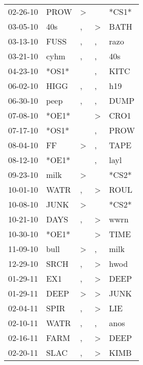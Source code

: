 \begin{supertabular}{lllll}
 02-26-10 &   PROW &     \textgreater &                  &  *CS1* \\
 03-05-10 &    40s &                , &     \textgreater &   BATH \\
 03-13-10 &   FUSS &                , &                , &   razo \\
 03-21-10 &   cyhm &                , &                , &    40s \\
 04-23-10 &  *OS1* &                  &                , &   KITC \\
 06-02-10 &   HIGG &                , &                , &    h19 \\
 06-30-10 &   peep &                , &                , &   DUMP \\
 07-08-10 &  *OE1* &                  &     \textgreater &   CRO1 \\
 07-17-10 &  *OS1* &                  &                , &   PROW \\
 08-04-10 &     FF &     \textgreater &                , &   TAPE \\
 08-12-10 &  *OE1* &                  &                , &   layl \\
 09-23-10 &   milk &     \textgreater &                  &  *CS2* \\
 10-01-10 &   WATR &                , &     \textgreater &   ROUL \\
 10-08-10 &   JUNK &     \textgreater &                  &  *CS2* \\
 10-21-10 &   DAYS &                , &     \textgreater &   wwrn \\
 10-30-10 &  *OE1* &                  &     \textgreater &   TIME \\
 11-09-10 &   bull &     \textgreater &                , &   milk \\
 12-29-10 &   SRCH &                , &     \textgreater &   hwod \\
 01-29-11 &    EX1 &                , &     \textgreater &   DEEP \\
 01-29-11 &   DEEP &     \textgreater &     \textgreater &   JUNK \\
 02-04-11 &   SPIR &                , &     \textgreater &    LIE \\
 02-10-11 &   WATR &                , &                , &   anos \\
 02-16-11 &   FARM &                , &     \textgreater &   DEEP \\
 02-20-11 &   SLAC &                , &     \textgreater &   KIMB \\

\end{supertabular}
